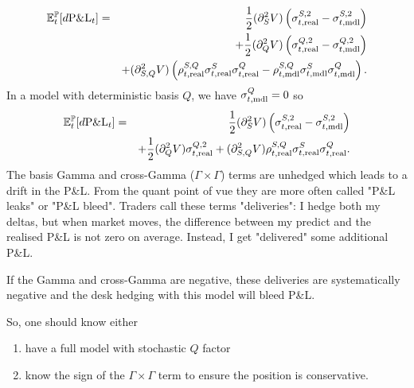 \documentclass[11pt,english]{amsart}
\newcommand{\PnL}{\mathrm{P\&L}}
\newcommand{\MTM}{\mathrm{MTM}}
\newcommand{\EE}{\mathbb{E}}
\newcommand{\PP}{\mathbb{P}}
\newcommand{\Cov}{\mathrm{Cov}}
\theoremstyle{definition}
\begin{document}

\begin{eqnarray}
  \EE^\PP_t[d\PnL_t]&=&  \frac{1}{2}(\partial^2_SV) \left( \sigma^{S,2}_{t,\rm{real}} -   \sigma^{S,2}_{t,\rm{mdl}} \right)  \\
  & & + \frac{1}{2}(\partial^2_QV) \left(  \sigma^{Q,2}_{t,\rm{real}} -   \sigma^{Q,2}_{t,\rm{mdl}} \right)   \\
  & & + (\partial^2_{S,Q}V) \left( \rho^{S,Q}_{t,\rm{real}} \sigma^S_{t,\rm{real}} \sigma^Q_{t,\rm{real}} -  \rho^{S,Q}_{t,\rm{mdl}} \sigma^S_{t,\rm{mdl}} \sigma^Q_{t,\rm{mdl}} \right)  .
\end{eqnarray}
In a model with deterministic basis $Q$, we have $\sigma^Q_{t,\rm{mdl}} = 0$ so 
\begin{eqnarray}
  \EE^\PP_t[d\PnL_t] &=&  \frac{1}{2}(\partial^2_SV) \left( \sigma^{S,2}_{t,\rm{real}} -   \sigma^{S,2}_{t,\rm{mdl}} \right)  \\
  & & + \frac{1}{2}(\partial^2_QV)  \sigma^{Q,2}_{t,\rm{real}}  + (\partial^2_{S,Q}V)  \rho^{S,Q}_{t,\rm{real}} \sigma^S_{t,\rm{real}} \sigma^Q_{t,\rm{real}} .
\end{eqnarray}
The basis Gamma and cross-Gamma ($\Gamma\times\Gamma$) terms are unhedged which leads to a drift in the P\&L. From the quant point of vue they are more often called "P\&L leaks" or "P\&L bleed". Traders call these terms "deliveries": I hedge both my deltas, but when market moves, the difference between my predict and the realised P\&L is not zero on average. Instead, I get "delivered" some additional P\&L. 

If the Gamma and cross-Gamma are negative, these deliveries are systematically negative and the desk hedging with this model will bleed P\&L. 

So, one should know either
\begin{enumerate}
\item have a full model with stochastic $Q$ factor
\item know the sign of the $\Gamma\times\Gamma$ term to ensure the position is conservative. 
\end{enumerate}
\end{document}
